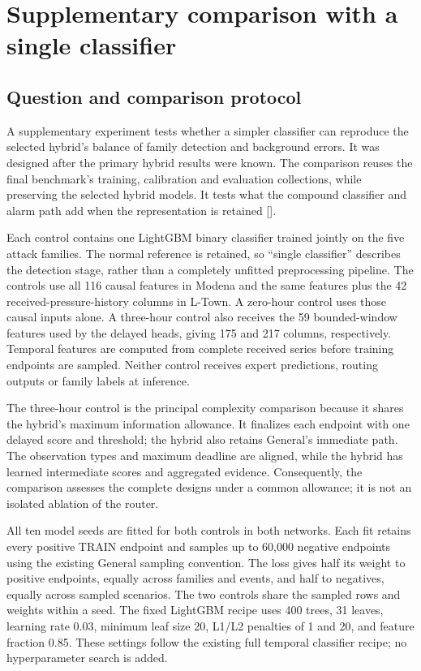 \FloatBarrier
\section{Supplementary comparison with a single classifier}
\label{sec:singlebaseline}
\subsection{Question and comparison protocol}
A supplementary experiment tests whether a simpler classifier can reproduce the selected hybrid's balance of family detection and background errors. It was designed after the primary hybrid results were known. The comparison reuses the final benchmark's training, calibration and evaluation collections, while preserving the selected hybrid models. It tests what the compound classifier and alarm path add when the representation is retained [].

Each control contains one LightGBM binary classifier trained jointly on the five attack families. The normal reference is retained, so ``single classifier'' describes the detection stage, rather than a completely unfitted preprocessing pipeline. The controls use all 116 causal features in Modena and the same features plus the 42 received-pressure-history columns in L-Town. A zero-hour control uses those causal inputs alone. A three-hour control also receives the 59 bounded-window features used by the delayed heads, giving 175 and 217 columns, respectively. Temporal features are computed from complete received series before training endpoints are sampled. Neither control receives expert predictions, routing outputs or family labels at inference.

The three-hour control is the principal complexity comparison because it shares the hybrid's maximum information allowance. It finalizes each endpoint with one delayed score and threshold; the hybrid also retains General's immediate path. The observation types and maximum deadline are aligned, while the hybrid has learned intermediate scores and aggregated evidence. Consequently, the comparison assesses the complete designs under a common allowance; it is not an isolated ablation of the router.

All ten model seeds are fitted for both controls in both networks. Each fit retains every positive TRAIN endpoint and samples up to 60,000 negative endpoints using the existing General sampling convention. The loss gives half its weight to positive endpoints, equally across families and events, and half to negatives, equally across sampled scenarios. The two controls share the sampled rows and weights within a seed. The fixed LightGBM recipe uses 400 trees, 31 leaves, learning rate 0.03, minimum leaf size 20, L1/L2 penalties of 1 and 20, and feature fraction 0.85. These settings follow the existing full temporal classifier recipe; no hyperparameter search is added.

